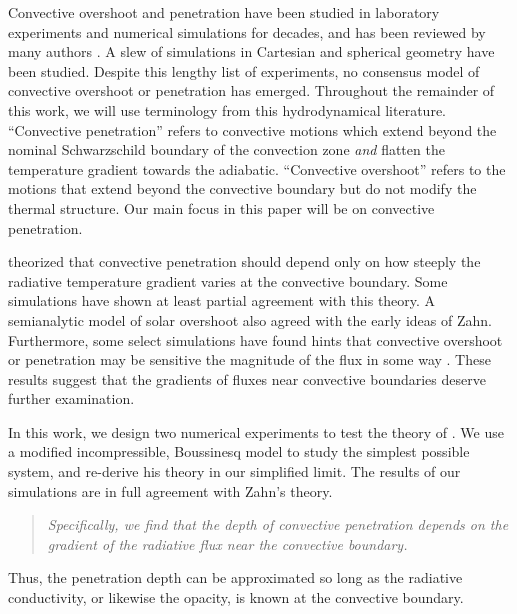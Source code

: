 \documentclass{aastex631}
\begin{document}
Convective overshoot and penetration have been studied in laboratory experiments and numerical simulations for decades, and has been reviewed by many authors \citep{marcus_etal_1983, zahn1991, browning_etal_2004, rogers_etal_2006, viallet_etal_2015, korre_etal_2019}.
A slew of simulations in Cartesian \citep{musman1968, moore_weiss_1973, hurlburt_etal_1986, hurlburt_etal_1994, singh_etal_1995, saikia_etal_2000, brummell_etal_2002, rogers_glatzmaier_2005, kapyla_etal_2007, tian_etal_2009, kitiashvili_etal_2016, lecoanet_etal_2016, kapyla_etal_2017, couston_etal_2017, toppaladoddi_wettlaufer_2018, kapyla2019, cai2020} and spherical \citep{browning_etal_2004, rogers_etal_2006, brun_etal_2017, pratt_etal_2017, dietrich_wicht_2018, higl_etal_2021} geometry have been studied.
Despite this lengthy list of experiments, no consensus model of convective overshoot or penetration has emerged.
Throughout the remainder of this work, we will use terminology from this hydrodynamical literature.
``Convective penetration'' refers to convective motions which extend beyond the nominal Schwarzschild boundary of the convection zone \emph{and} flatten the temperature gradient towards the adiabatic.
``Convective overshoot'' refers to the motions that extend beyond the convective boundary but do not modify the thermal structure.
Our main focus in this paper will be on convective penetration.

\citet{zahn1991} theorized that convective penetration should depend only on how steeply the radiative temperature gradient varies at the convective boundary.
Some simulations \citep{hurlburt_etal_1994, rogers_etal_2006} have shown at least partial agreement with this theory.
A semianalytic model of solar overshoot \citep{rempel2004} also agreed with the early ideas of Zahn. 
Furthermore, some select simulations have found hints that convective overshoot or penetration may be sensitive the magnitude of the flux in some way \citep{singh_etal_1998, hotta2017, kapyla2019}.
These results suggest that the gradients of fluxes near convective boundaries deserve further examination.

In this work, we design two numerical experiments to test the theory of \citet{zahn1991}.
We use a modified incompressible, Boussinesq model to study the simplest possible system, and re-derive his theory in our simplified limit.
The results of our simulations are in full agreement with Zahn's theory.
\begin{quote}
\emph{
Specifically, we find that the depth of convective penetration depends on the gradient of the radiative flux near the convective boundary.
}
\end{quote}
Thus, the penetration depth can be approximated so long as the radiative conductivity, or likewise the opacity, is known at the convective boundary.
\end{document}
